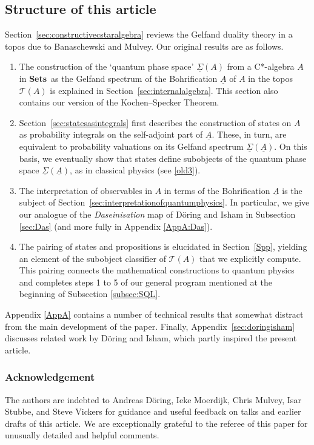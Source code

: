 \documentclass[11pt]{article}
\newcommand{\Sets}{\mbox{\textbf{Sets}}}
\newcommand{\er}{\eqref}
\newcommand{\alg}[1]{\ensuremath{#1}}
\newcommand{\functor}[1]{\ensuremath{\underline{#1}}}
\newcommand{\asstopos}{\ensuremath{\mathcal{T}}}
\newcommand{\uA}{\underline{A}}
\newcommand{\TA}{\mathcal{T}(A)}
\newcommand{\ulS}{\functor{\Sigma}}
\renewcommand{\TA}{\asstopos(\alg{A})}
\begin{document}
\subsection{Structure of this article}\label{mainresults}
Section~\ref{sec:constructivecstaralgebra} reviews the Gelfand
duality theory in a topos due to Banaschewski and Mulvey.
Our original results are as follows.
\begin{enumerate}
\item The  construction of
the `quantum phase space' $\ulS(A)$ from
a C*-algebra $A$ in \Sets\
as the Gelfand spectrum of the Bohrification $\uA$ of $A$ in the topos $\TA$
 is explained in Section~\ref{sec:internalalgebra}. This section also contains
our version of the Kochen--Specker Theorem.
\item Section~\ref{sec:statesasintegrals} first describes
the construction of states on $A$ as probability integrals on the self-adjoint
part of $\uA$. These, in turn, are equivalent to probability valuations on its
Gelfand spectrum
 $\ulS(\uA)$. On this basis, we eventually show that states define subobjects of
the quantum phase space  $\ulS(\uA)$, as in classical physics (see \er{old3}).
\item  The interpretation of observables in $A$ in terms of the
  Bohrification $\uA$ is the subject of
  Section~\ref{sec:interpretationofquantumphysics}. In particular, we
  give our analogue of the {\it Daseinisation} map of D{\"o}ring and
  Isham in Subsection \ref{sec:Das} (and more fully in Appendix \ref{AppA:Das}).
\item The pairing of states and propositions is elucidated in Section~\ref{Spp},
yielding an
element of the subobject classifier of $\TA$ that we explicitly compute. This
pairing  connects the
mathematical constructions to  quantum physics and completes steps 1 to 5 of our
general program mentioned at the beginning of Subsection \ref{subsec:SQL}.
\end{enumerate}
Appendix \ref{AppA} contains a number of technical results that somewhat
distract from the main development of the paper. Finally,
Appendix~\ref{sec:doringisham} discusses related work by
D{\"o}ring and Isham, which partly inspired the present article.
\subsubsection*{Acknowledgement}
The authors are
indebted to Andreas D{\"o}ring, Ieke Moerdijk,  Chris Mulvey, Isar Stubbe, and
Steve Vickers for guidance and
useful feedback on talks and earlier drafts of this article. We are exceptionally
grateful to the referee of this paper for unusually detailed and helpful
comments.
\end{document}
